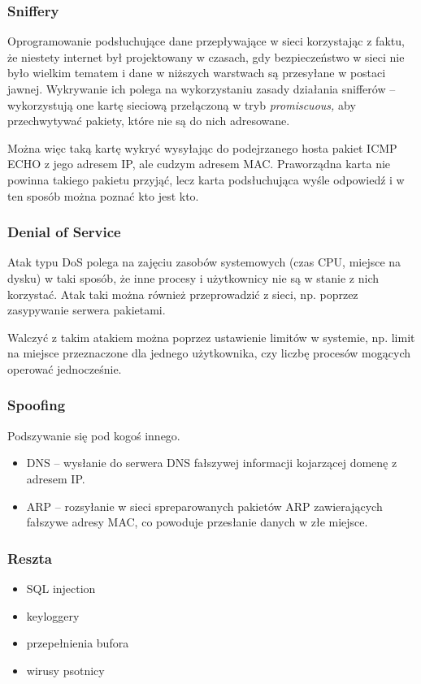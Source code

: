 \subsubsection{Sniffery}
Oprogramowanie podsłuchujące dane przepływające w sieci korzystając z faktu, że niestety internet był projektowany w czasach, gdy bezpieczeństwo w sieci nie było wielkim tematem i dane w niższych warstwach są przesyłane w postaci jawnej.
Wykrywanie ich polega na wykorzystaniu zasady działania snifferów -- wykorzystują one kartę sieciową przełączoną w tryb \textit{promiscuous,} aby przechwytywać pakiety, które nie są do nich adresowane.

Można więc taką kartę wykryć wysyłając do podejrzanego hosta pakiet ICMP ECHO z jego adresem IP, ale cudzym adresem MAC.
Praworządna karta nie powinna takiego pakietu przyjąć, lecz karta podsłuchująca wyśle odpowiedź i w ten sposób można poznać kto jest kto.

\subsubsection{Denial of Service}
Atak typu DoS polega na zajęciu zasobów systemowych (czas CPU, miejsce na dysku) w taki sposób, że inne procesy i użytkownicy nie są w stanie z nich korzystać.
Atak taki można również przeprowadzić z sieci, np. poprzez zasypywanie serwera pakietami.

Walczyć z takim atakiem można poprzez ustawienie limitów w systemie, np. limit na miejsce przeznaczone dla jednego użytkownika, czy liczbę procesów mogących operować jednocześnie.

\subsubsection{Spoofing}
Podszywanie się pod kogoś innego.
\begin{itemize}
	\item{DNS -- wysłanie do serwera DNS fałszywej informacji kojarzącej domenę z adresem IP.}
	\item{ARP -- rozsyłanie w sieci spreparowanych pakietów ARP zawierających fałszywe adresy MAC, co powoduje przesłanie danych w złe miejsce.}
\end{itemize}

\subsubsection{Reszta}
\begin{itemize}
	\item{SQL injection}
	\item{keyloggery}
	\item{przepełnienia bufora}
	\item{wirusy psotnicy}
\end{itemize}